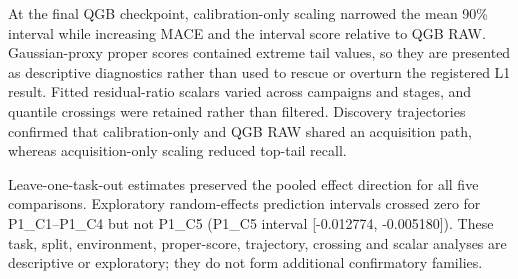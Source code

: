 \documentclass[10pt]{article}
\begin{document}
At the final QGB checkpoint, calibration-only scaling narrowed the mean 90\% interval while increasing MACE and the interval score relative to QGB RAW. Gaussian-proxy proper scores contained extreme tail values, so they are presented as descriptive diagnostics rather than used to rescue or overturn the registered L1 result. Fitted residual-ratio scalars varied across campaigns and stages, and quantile crossings were retained rather than filtered. Discovery trajectories confirmed that calibration-only and QGB RAW shared an acquisition path, whereas acquisition-only scaling reduced top-tail recall.

Leave-one-task-out estimates preserved the pooled effect direction for all five comparisons. Exploratory random-effects prediction intervals crossed zero for P1\_C1--P1\_C4 but not P1\_C5 (P1\_C5 interval [-0.012774, -0.005180]). These task, split, environment, proper-score, trajectory, crossing and scalar analyses are descriptive or exploratory; they do not form additional confirmatory families.
\end{document}
